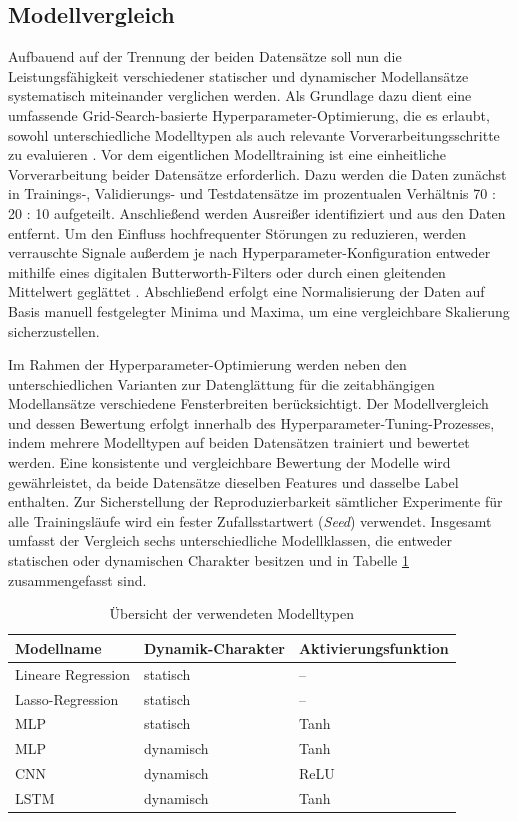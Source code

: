 \subsection{Modellvergleich} \label{sec:modellvergleich}
Aufbauend auf der Trennung der beiden Datensätze soll nun die Leistungsfähigkeit verschiedener statischer und dynamischer Modellansätze systematisch miteinander verglichen werden. Als Grundlage dazu dient eine umfassende Grid-Search-basierte Hyperparameter-Optimierung, die es erlaubt, sowohl unterschiedliche Modelltypen als auch relevante Vorverarbeitungsschritte zu evaluieren \cite{marijan.2026}.
Vor dem eigentlichen Modelltraining ist eine einheitliche Vorverarbeitung beider Datensätze erforderlich. Dazu werden die Daten zunächst in Trainings-, Validierungs- und Testdatensätze im prozentualen Verhältnis 70 : 20 : 10 aufgeteilt. Anschließend werden Ausreißer identifiziert und aus den Daten entfernt. Um den Einfluss hochfrequenter Störungen zu reduzieren, werden verrauschte Signale außerdem je nach Hyperparameter-Konfiguration entweder mithilfe eines digitalen Butterworth-Filters oder durch einen gleitenden Mittelwert geglättet \cite{oppenheim.2010}. Abschließend erfolgt eine Normalisierung der Daten auf Basis manuell festgelegter Minima und Maxima, um eine vergleichbare Skalierung sicherzustellen. \par 
Im Rahmen der Hyperparameter-Optimierung werden neben den unterschiedlichen Varianten zur Datenglättung für die zeitabhängigen Modellansätze verschiedene Fensterbreiten berücksichtigt. Der Modellvergleich und dessen Bewertung erfolgt innerhalb des Hyperparameter-Tuning-Prozesses, indem mehrere Modelltypen auf beiden Datensätzen trainiert und bewertet werden. Eine konsistente und vergleichbare Bewertung der Modelle wird gewährleistet, da beide Datensätze dieselben Features und dasselbe Label enthalten. Zur Sicherstellung der Reproduzierbarkeit sämtlicher Experimente für alle Trainingsläufe wird ein fester Zufallsstartwert (\emph{Seed}) verwendet. Insgesamt umfasst der Vergleich sechs unterschiedliche Modellklassen, die entweder statischen oder dynamischen Charakter besitzen und in Tabelle \ref{tab:models} zusammengefasst sind. 
%
\begin{table}[tbp] 
\centering
\caption{Übersicht der verwendeten Modelltypen}
\label{tab:models}
\begin{tabular}{lll}
\toprule
\textbf{Modellname} & \textbf{Dynamik-Charakter} & \textbf{Aktivierungsfunktion} \\
\midrule
Lineare Regression & statisch & -- \\
Lasso-Regression & statisch & -- \\
\ac{MLP} & statisch & Tanh \\
\ac{MLP} & dynamisch & Tanh \\
\ac{CNN} & dynamisch & ReLU \\
\ac{LSTM} & dynamisch & Tanh \\
\bottomrule
\end{tabular}
\end{table}
